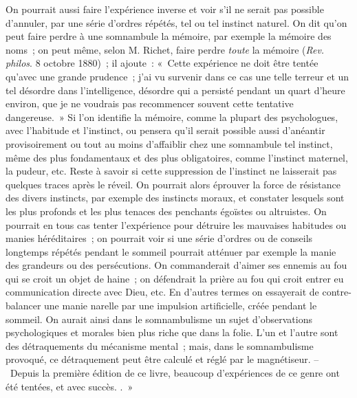 \documentclass[french,twoside]{book} %
\begin{document}
{ On pourrait aussi faire l’expérience inverse et voir s’il ne serait pas possible d’annuler, par une série d’ordres répétés, tel ou tel instinct naturel. On dit qu’on peut faire perdre à une somnambule la mémoire, par exemple la mémoire des noms ; on peut même, selon M. Richet, faire perdre \emph{toute} la mémoire (\emph{Rev. philos}. 8 octobre 1880) ; il ajoute : « Cette expérience ne doit être tentée qu’avec une grande prudence ; j’ai vu survenir dans ce cas une telle terreur et un tel désordre dans l’intelligence, désordre qui a persisté pendant un quart d’heure environ, que je ne voudrais pas recommencer souvent cette tentative dangereuse. » Si l’on identifie la mémoire, comme la plupart des psychologues, avec l’habitude et l’instinct, ou pensera qu’il serait possible aussi d’anéantir provisoirement ou tout au moins d’affaiblir chez une somnambule tel instinct, même des plus fondamentaux et des plus obligatoires, comme l’instinct maternel, la pudeur, etc. Reste à savoir si cette suppression de l’instinct ne laisserait pas quelques traces après le réveil. On pourrait alors éprouver la force de résistance des divers instincts, par exemple des instincts moraux, et constater lesquels sont les plus profonds et les plus tenaces des penchants égoïstes ou altruistes. On pourrait en tous cas tenter l’expérience pour détruire les mauvaises habitudes ou manies héréditaires ; on pourrait voir si une série d’ordres ou de conseils longtemps répétés pendant le sommeil pourrait atténuer par exemple la manie des grandeurs ou des persécutions. On commanderait d’aimer ses ennemis au fou qui se croit un objet de haine ; on défendrait la prière au fou qui croit entrer eu communication directe avec Dieu, etc. En d’autres termes on essayerait de contre-balancer une manie narelle par une impulsion artificielle, créée pendant le sommeil. On aurait ainsi dans le somnambulisme un sujet d’observations psychologiques et morales bien plus riche que dans la folie. L’un et l’autre sont des détraquements du mécanisme mental ; mais, dans le somnambulisme provoqué, ce détraquement peut être calculé et réglé par le magnétiseur. – Depuis la première édition de ce livre, beaucoup d’expériences de ce genre ont été tentées, et avec succès.
}. »\par
\end{document}
